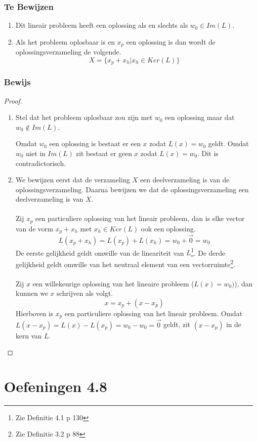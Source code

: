 \documentclass[lineaire_algebra_oplossingen.tex]{subfiles}
\begin{document}
\subsubsection*{Te Bewijzen}
\begin{enumerate}
\item Dit lineair probleem heeft een oplossing als en slechts als $w_0 \in Im(L)$.

\item
Als het probleem oplosbaar is en $x_p$ een oplossing is dan wordt de oplossingsverzameling de volgende.
\[
X = \{x_p + x_h | x_h \in Ker(L)\}
\]
\end{enumerate}

\subsubsection*{Bewijs}
\begin{proof}
\begin{enumerate}
\item Stel dat het probleem oplosbaar zou zijn met $w_0$ een oplossing maar dat $w_0 \not\in Im(L)$.

Omdat $w_0$ een oplossing is bestaat er een $x$ zodat $L(x) = w_0$ geldt. Omdat $w_0$ niet in $Im(L)$ zit bestaat er geen $x$ zodat $L(x) = w_0$. Dit is contradictorisch.
\item
We bewijzen eerst dat de verzameling $X$ een deelverzameling is van de oplossingsverzameling. Daarna bewijzen we dat de oplossingsverzameling een deelverzameling is van $X$.\\\\
Zij $x_p$ een particuliere oplossing van het lineair probleem, dan is elke vector van de vorm $x_p+x_h$ met $x_h\in Ker(L)$ ook een oplossing.
\[
L(x_p+x_h)=L(x_p)+L(x_h)=w_0+\vec{0} = w_0
\]
De eerste gelijkheid geldt omwille van de lineariteit van $L$\footnote{Zie Definitie 4.1 p 130}. De derde gelijkheid geldt omwille van het neutraal element van een vectorruimte\footnote{Zie Definitie 3.2 p 88}.\\\\
Zij $x$ een willekeurige oplossing van het lineaire probleem ($L(x)=w_0)$), dan kunnen we $x$ schrijven als volgt.
\[
x = x_p + (x-x_p)
\]
Hierboven is $x_p$ een particuliere oplossing van het lineair probleem. Omdat $L(x-x_p) = L(x) - L(x_p) = w_0-w_0=\vec{0}$ geldt, zit $(x-x_p)$ in de kern van $L$.
\end{enumerate}
\end{proof}


\section{Oefeningen 4.8}
\end{document}
